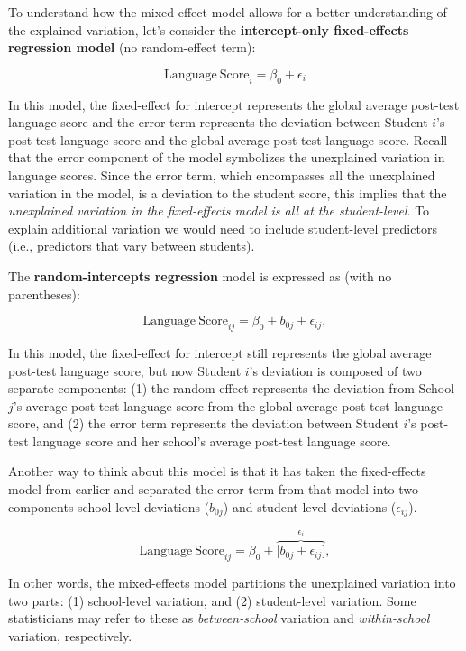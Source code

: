 \documentclass[]{book}
\begin{document}
To understand how the mixed-effect model allows for a better understanding of the explained variation, let's consider the \textbf{intercept-only fixed-effects regression model} (no random-effect term):

\[
\mathrm{Language~Score}_{i} = \beta_0 + \epsilon_{i}
\]

In this model, the fixed-effect for intercept represents the global average post-test language score and the error term represents the deviation between Student \(i\)'s post-test language score and the global average post-test language score. Recall that the error component of the model symbolizes the unexplained variation in language scores. Since the error term, which encompasses all the unexplained variation in the model, is a deviation to the student score, this implies that the \emph{unexplained variation in the fixed-effects model is all at the student-level}. To explain additional variation we would need to include student-level predictors (i.e., predictors that vary between students).

The \textbf{random-intercepts regression} model is expressed as (with no parentheses):

\[
\mathrm{Language~Score}_{ij} = \beta_0 + b_{0j} + \epsilon_{ij},
\]

In this model, the fixed-effect for intercept still represents the global average post-test language score, but now Student \(i\)'s deviation is composed of two separate components: (1) the random-effect represents the deviation from School \(j\)'s average post-test language score from the global average post-test language score, and (2) the error term represents the deviation between Student \(i\)'s post-test language score and her school's average post-test language score.

Another way to think about this model is that it has taken the fixed-effects model from earlier and separated the error term from that model into two components school-level deviations (\(b_{0j}\)) and student-level deviations (\(\epsilon_{ij}\)).

\[
\mathrm{Language~Score}_{ij} = \beta_0 + \overbrace{\big[b_{0j} + \epsilon_{ij}\big]}^{\epsilon_i},
\]

In other words, the mixed-effects model partitions the unexplained variation into two parts: (1) school-level variation, and (2) student-level variation. Some statisticians may refer to these as \emph{between-school} variation and \emph{within-school} variation, respectively.
\end{document}
